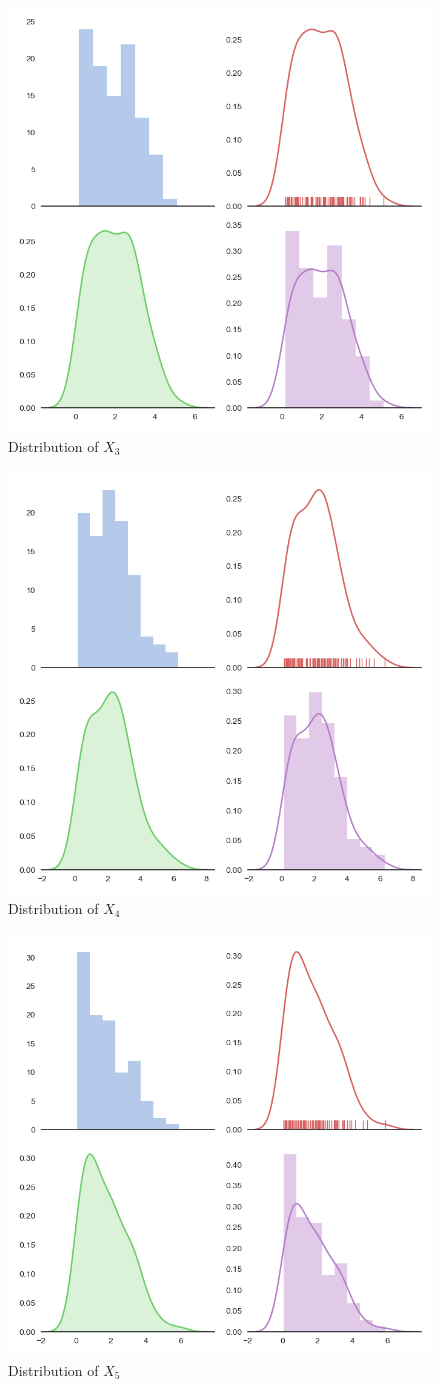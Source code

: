 \documentclass[10pt,journal]{IEEEtran}
\begin{document}
\begin{figure}[!ht]
	\centering
	\includegraphics[width=0.7\columnwidth,height=0.525\linewidth]{Posterior_3.png}
	\caption{Distribution of \(X_3\)}
\end{figure}
\begin{figure}[!ht]
	\centering
	\includegraphics[width=0.7\columnwidth,height=0.525\linewidth]{Posterior_4.png}
	\caption{Distribution of \(X_4\)}
\end{figure}
\begin{figure}[!ht]
	\centering
	\includegraphics[width=0.7\columnwidth,height=0.5\linewidth]{Posterior_5.png}
	\caption{Distribution of \(X_5\)}
\end{figure}
\end{document}
